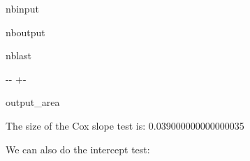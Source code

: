 \documentclass[letterpaper,10pt,english]{sphinxmanual}
\begin{document}
\begin{sphinxuseclass}{nbinput}
{
\begin{sphinxVerbatim}[commandchars=\\\{\}]
\llap{\color{nbsphinxin}[5]:\,\hspace{\fboxrule}\hspace{\fboxsep}}  \PYG{p}{[}\PYG{p}{]}
  \PYG{p}{[}\PYG{p}{]}
  \PYG{p}{[}\PYG{p}{]}
   
 
\end{sphinxVerbatim}
}

\end{sphinxuseclass}
\begin{sphinxuseclass}{nboutput}
\begin{sphinxuseclass}{nblast}
{

\kern-\sphinxverbatimsmallskipamount\kern-\baselineskip
\kern+\FrameHeightAdjust\kern-\fboxrule
\vspace{\nbsphinxcodecellspacing}

\begin{sphinxuseclass}{output_area}
\begin{sphinxuseclass}{}


\begin{sphinxVerbatim}[commandchars=\\\{\}]
The size of the Cox slope test is:  0.039000000000000035
\end{sphinxVerbatim}



\end{sphinxuseclass}
\end{sphinxuseclass}
}

\end{sphinxuseclass}
\end{sphinxuseclass}
\sphinxAtStartPar
We can also do the intercept test:
\end{document}
